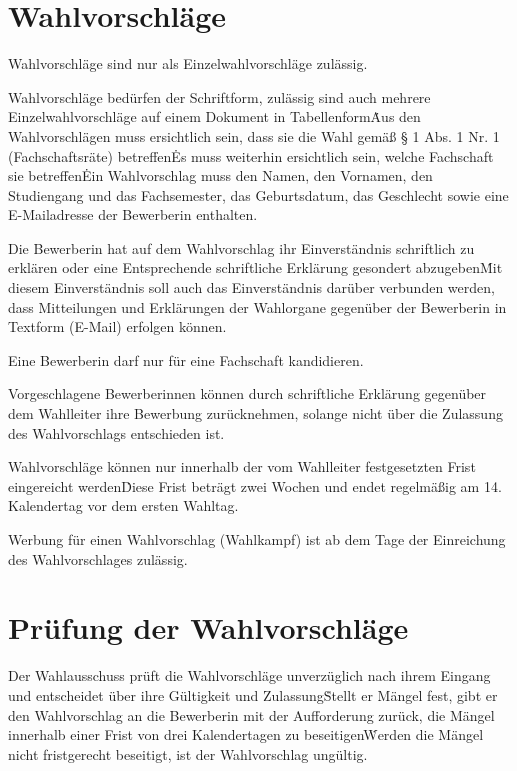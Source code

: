 \begin{multicols}{2}
\section{Wahlvorschläge}
\Abs \Satz Wahlvorschläge sind nur als Einzelwahlvorschläge zulässig.

\Abs \Satz Wahlvorschläge bedürfen der Schriftform, zulässig sind auch mehrere Einzelwahlvorschläge auf einem Dokument in Tabellenform\. Aus den Wahlvorschlägen muss ersichtlich sein, dass sie die Wahl gemäß § 1 Abs. 1 Nr. 1 (Fachschaftsräte) betreffen\. Es muss weiterhin ersichtlich sein, welche Fachschaft sie betreffen\. Ein Wahlvorschlag muss den Namen, den Vornamen, den Studiengang und das Fachsemester, das Geburtsdatum, das Geschlecht sowie eine E-Mailadresse der Bewerberin enthalten.

\Abs \Satz Die Bewerberin hat auf dem Wahlvorschlag ihr Einverständnis schriftlich zu erklären oder eine Entsprechende schriftliche Erklärung gesondert abzugeben\. Mit diesem Einverständnis soll auch das Einverständnis darüber verbunden werden, dass Mitteilungen und Erklärungen der Wahlorgane gegenüber der Bewerberin in Textform (E-Mail) erfolgen können.

\Abs \Satz Eine Bewerberin darf nur für eine Fachschaft kandidieren.

\Abs \Satz Vorgeschlagene Bewerberinnen können durch schriftliche Erklärung gegenüber dem Wahlleiter ihre Bewerbung zurücknehmen, solange nicht über die Zulassung des Wahlvorschlags entschieden ist.

\Abs \Satz Wahlvorschläge können nur innerhalb der vom Wahlleiter festgesetzten Frist eingereicht werden\. Diese Frist beträgt zwei Wochen und endet regelmäßig am 14. Kalendertag vor dem ersten Wahltag.

\Abs \Satz Werbung für einen Wahlvorschlag (Wahlkampf) ist ab dem Tage der Einreichung des Wahlvorschlages zulässig.

\section{Prüfung der Wahlvorschläge}
\Abs \Satz Der Wahlausschuss prüft die Wahlvorschläge unverzüglich nach ihrem Eingang und entscheidet über ihre Gültigkeit und Zulassung\. Stellt er Mängel fest, gibt er den Wahlvorschlag an die Bewerberin mit der Aufforderung zurück, die Mängel innerhalb einer Frist von drei Kalendertagen zu beseitigen\. Werden die Mängel nicht fristgerecht beseitigt, ist der Wahlvorschlag ungültig.


\end{multicols}
